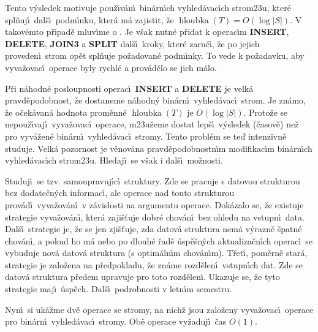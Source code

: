 \documentclass[a4paper,12pt]{article}
\def \emph#1{\underbar{#1}}
\DeclareMathOperator*{\hloubka}{hloubka}
\begin{document}
\flushpar Tento v\'ysledek motivuje pou\v z\'\i v\'an\'\i\ bin\'arn\'\i ch 
vyhled\'avac\'\i ch strom\accent23u, kter\'e spl\v nuj\'\i\ dal\v s\'\i\ 
podm\'\i nku, kter\'a m\'a zajistit, \v ze 
$\hloubka(T)=O(\log|S|)$.  V takov\'emto p\v r\'\i pad\v e mluv\'\i me o 
\emph{vyv\'a\v zen\'ych} \emph{bin\'arn\'\i ch} 
\emph{vyhled\'avac\'\i ch} \emph{stromech}.  Je v\v sak nutn\'e 
p\v ridat k ope\-rac\'\i m {\bf INSERT}, {\bf DELETE}, {\bf JOIN3} a {\bf SPLIT} dal\v s\'\i\ 
kroky, kter\'e 
zaru\v c\'\i , \v ze po jejich proveden\'\i\ strom op\v et spl\v nuje 
po\v zadovan\'e podm\'\i nky.  To vede k po\v zadavku, aby 
vyva\v zovac\'\i\ operace byly rychl\'e a prov\'ad\v elo se jich m\'alo.  
\medskip

\flushpar P\v ri n\'ahodn\'e posloupnosti operac\'\i\ {\bf INSERT} a {\bf DELETE} je 
velk\'a pravd\v epodobnost, \v ze dostaneme n\'ahodn\'y bin\'arn\'\i\ 
vy\-hled\'avac\'\i\ strom.  Je zn\'amo, \v ze o\v cek\'avan\'a hodnota prom\v en\-n\'e 
$\hloubka(T)$ je $O(\log|S|)$.  Proto\v ze se nepou\v z\'\i vaj\'\i\ vyva\v zovac\'\i\ 
operace, m\accent23u\v zeme dostat lep\v s\'\i\ v\'ysledek (\v casov\v e) ne\v z pro 
vyv\'a\-\v zen\'e bin\'ar\-n\'\i\ vyhled\'avac\'\i\ stromy.  Tento probl\'em se te\v d 
intenzivn\v e studu\-je.  Velk\'a pozornost je v\v enov\'ana 
pravd\v epodobnost\-n\'\i m modifikac\'\i m bin\'arn\'\i ch vyhled\'avac\'\i ch 
strom\accent23u.  Hledaj\'\i\ se v\v sak i dal\v s\'\i\ mo\v znosti.  
\medskip

\flushpar Studuj\'\i\ se tzv.  samoupravuj\'\i c\'\i\ struktury.  Zde se 
pracuje s datovou strukturou bez dodate\v cn\'ych informac\'\i , ale 
operace nad touto strukturou prov\'ad\'\i\ vyva\v zov\'an\'\i\ v z\'avislosti 
na argumentu operace.  Dok\'azalo se, \v ze existuje strategie 
vyva\v zov\'an\'\i , kter\'a zaji\v s\v tuje dobr\'e chov\'an\'\i\ bez ohledu na 
vstupn\'\i\ data.  Dal\v s\'\i\ strategie je, \v ze se jen zji\v s\v tuje, zda datov\'a 
struktura nem\'a v\'yraz\-n\v e \v spatn\'e chov\'an\'\i , a pokud ho m\'a nebo 
po dlouh\'e \v rad\v e \'usp\v e\v s\-n\'ych aktualiza\v cn\'\i ch operac\'\i\ se vybuduje 
nov\'a datov\'a struktura (s optim\'aln\'\i m chov\'an\'\i m).  T\v ret\'\i , 
pom\v ern\v e star\'a, strategie je zalo\-\v ze\-na na p\v redpokladu, \v ze 
zn\'ame rozd\v elen\'\i\ vstupn\'\i ch dat.  Zde se datov\'a struktura 
p\v redem upravuje pro toto rozd\v elen\'\i .  Ukazuje se, \v ze tyto 
strategie maj\'\i\ \'usp\v ech.  Dal\v s\'\i\ podrobnosti v letn\'\i m semestru.  
\medskip

\flushpar Nyn\'\i\ si uk\'a\v zme dv\v e operace se stromy, na nich\v z jsou 
zalo\v zeny  vyva\v zovac\'\i\ operace pro bin\'arn\'\i\ vyhled\'avac\'\i\ 
stromy. Ob\v e ope\-race vy\v zaduj\'\i\ \v cas $O(1)$.
\medskip
\end{document}

